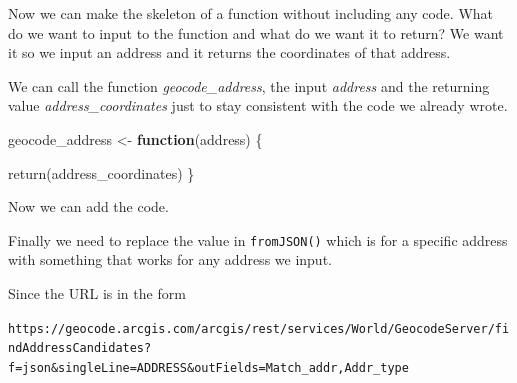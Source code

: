 \documentclass[
  12pt,
]{book}
\newenvironment{Shaded}{\begin{snugshade}}{\end{snugshade}}
\newcommand{\ControlFlowTok}[1]{\textcolor[rgb]{0.27,0.27,0.27}{\textbf{#1}}}
\newcommand{\DecValTok}[1]{\textcolor[rgb]{0.06,0.06,0.06}{#1}}
\newcommand{\FunctionTok}[1]{\textcolor[rgb]{0,0,0}{#1}}
\newcommand{\NormalTok}[1]{#1}
\newcommand{\OtherTok}[1]{\textcolor[rgb]{0.37,0.37,0.37}{#1}}
\newcommand{\SpecialCharTok}[1]{\textcolor[rgb]{0,0,0}{#1}}
\newcommand{\StringTok}[1]{\textcolor[rgb]{0.5,0.5,0.5}{#1}}
\begin{document}
Now we can make the skeleton of a function without including any code. What do we want to input to the function and what do we want it to return? We want it so we input an address and it returns the coordinates of that address.

We can call the function \emph{geocode\_address}, the input \emph{address} and the returning value \emph{address\_coordinates} just to stay consistent with the code we already wrote.

\begin{Shaded}
\begin{Highlighting}[]
\NormalTok{geocode\_address }\OtherTok{\textless{}{-}} \ControlFlowTok{function}\NormalTok{(address) \{}
   
   \FunctionTok{return}\NormalTok{(address\_coordinates)}
\NormalTok{\}}
\end{Highlighting}
\end{Shaded}

Now we can add the code.

\begin{Shaded}
\end{Shaded}

Finally we need to replace the value in \texttt{fromJSON()} which is for a specific address with something that works for any address we input.

Since the URL is in the form

\texttt{https://geocode.arcgis.com/arcgis/rest/services/World/GeocodeServer/findAddressCandidates?f=json\&singleLine=ADDRESS\&outFields=Match\_addr,Addr\_type}
\end{document}
